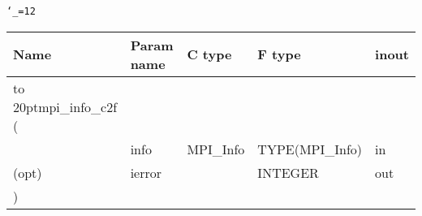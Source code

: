 \begingroup\tt\catcode`\_=12
\begin{tabular}{lllll}
\toprule
\textrm{Name}&\textrm{Param name}&\textrm{C type}&\textrm{F type}&\textrm{inout}\\
\midrule
\hbox to 20pt{mpi_info_c2f (\hss} \\
&info&MPI_Info&TYPE(MPI_Info)&in\\
(opt)&ierror&&INTEGER&out\\
)\\
\bottomrule
\end{tabular}
\endgroup

